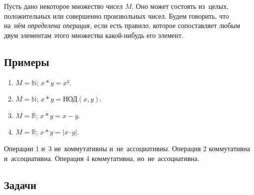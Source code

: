 


Пусть дано некоторое множество чисел $M$.
Оно может состоять из~целых, положительных или совершенно произвольных чисел.
Будем говорить, что на~нём \emph{определена операция,} если есть правило,
которое сопоставляет любым двум элементам этого множества какой-нибудь его
элемент.

\subsection*{Примеры}

\begin{enumerate}

\item
$M = \mathbb{N}$; $x \ast y = x^{y}$.

\item
$M = \mathbb{N}$; $x \ast y = \text{НОД}(x, y)$.

\item
$M = \mathbb{R}$; $x \ast y = x - y$.

\item
$M = \mathbb{R}$; $x \ast y = \lvert x–y \rvert$.

\end{enumerate}
Операции 1 и~3 не~коммутативны и~не~ассоциативны.
Операция 2 коммутативна и~ассоциативна.
Операция 4 коммутативна, но~не~ассоциативна.

\subsection*{Задачи}

